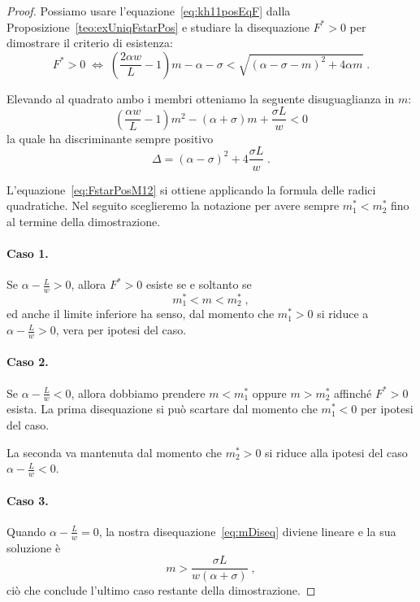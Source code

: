\begin{proof}
Possiamo usare l'equazione~\eqref{eq:kh11posEqF} dalla Proposizione~\ref{teo:exUniqFstarPos} e studiare
la disequazione $F^* >0$ per dimostrare il criterio di esistenza:
$$F^* > 0 \; \iff \;
\left( \frac{2 \alpha w}{L} -1 \right) m - \alpha - \sigma < \sqrt{ {(\alpha - \sigma -m)}^2 + 4 \alpha m } \; .$$

Elevando al quadrato ambo i membri otteniamo la seguente disuguaglianza in $m$:
\begin{equation}
    \left( \frac{\alpha w}{L} -1 \right) m^2 -( \alpha + \sigma) m + \frac{\sigma L}{w} < 0
    \label{eq:mDiseq}
\end{equation}
la quale ha discriminante sempre positivo
$$\Delta = {(\alpha -\sigma)}^2 +4 \frac{\sigma L}{w} \; .$$

L'equazione~\eqref{eq:FstarPosM12} si ottiene applicando la formula delle radici quadratiche.
Nel seguito sceglieremo la notazione per avere sempre $m_1^* < m_2^*$ fino al termine della dimostrazione.

\paragraph{Caso 1.}
Se $\alpha - \frac{L}{w} >0$, allora $F^*>0$ esiste se e soltanto se
$$m_1^* < m < m_2^* \; ,$$
ed anche il limite inferiore ha senso, dal momento che
$m_1^* > 0$ si riduce a $\alpha - \frac{L}{w}>0$, vera per ipotesi del caso.

\paragraph{Caso 2.}
Se $\alpha -\frac{L}{w} <0$, allora dobbiamo prendere $m < m_1^*$ oppure $m > m_2^*$ affinché $F^* >0$ esista.
La prima disequazione si può scartare dal momento che $m_1^* <0$ per ipotesi del caso.

La seconda va mantenuta dal momento che $m_2^* >0$ si riduce alla ipotesi del caso $\alpha - \frac{L}{w} < 0$.

\paragraph{Caso 3.}
Quando $\alpha - \frac{L}{w} =0$, la nostra disequazione~\eqref{eq:mDiseq} diviene lineare e la sua soluzione è
$$m > \frac{\sigma L}{w (\alpha +\sigma)} \; ,$$
ciò che conclude l'ultimo caso restante della dimostrazione.
\end{proof}

